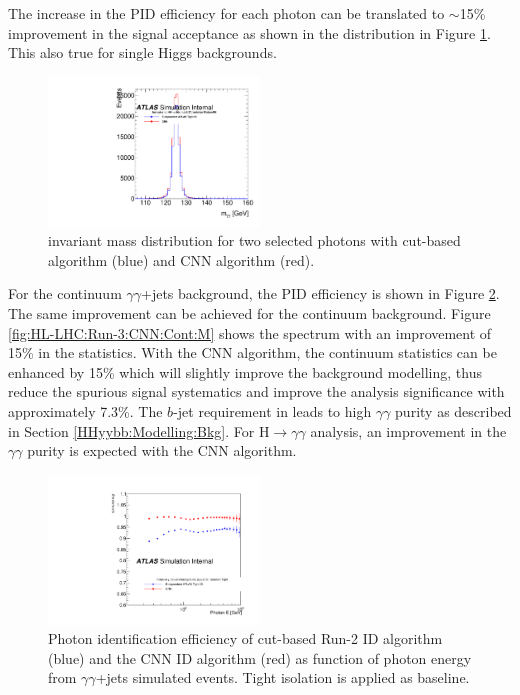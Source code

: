 The increase in the PID efficiency for each photon can be translated to $\sim$15\% improvement in the signal acceptance as shown in the \myy distribution in Figure \ref{fig:HL-LHC:Run-3:CNN:M}. This also true for single Higgs backgrounds.\\
 
\begin{figure}[htbp]
    \centering
    \includegraphics[width=0.5\textwidth]{Ch6/Img/Eff_MixtureNN_All_Inclusive_Tight_M.pdf}
     \begin{tcolorbox}[colback=black!5!white, colframe=white!75!black]
    \caption{\myy invariant mass distribution for two selected photons with cut-based algorithm (blue) and CNN algorithm (red).}
    \label{fig:HL-LHC:Run-3:CNN:M}
    \end{tcolorbox}
\end{figure}

For the continuum $\gamma\gamma$+jets background, the PID efficiency is shown in Figure \ref{fig:HL-LHC:Run-3:CNN:Cont:E}. The same improvement can be achieved for the continuum background. Figure \ref{fig:HL-LHC:Run-3:CNN:Cont:M} shows the \myy spectrum with an improvement of 15\% in the statistics. With the CNN algorithm, the continuum statistics can be enhanced by 15\% which will slightly improve the background modelling, thus reduce the spurious signal systematics and improve the analysis significance with approximately 7.3\%. The $b$-jet requirement in \HHyybb leads to high $\gamma\gamma$ purity as described in Section \ref{HHyybb:Modelling:Bkg}. For H$\to\gamma\gamma$ analysis, an improvement in the $\gamma\gamma$ purity is expected with the CNN algorithm.

\begin{figure}[htbp]
    \centering
    \includegraphics[width=0.5\textwidth]{Ch6/Img/Eff_Tight_All_Inclusive_Tight_E.pdf}
    \begin{tcolorbox}[colback=black!5!white, colframe=white!75!black]
    \caption{Photon identification efficiency of cut-based Run-2 ID algorithm (blue) and the CNN ID algorithm (red) as function of photon energy from $\gamma\gamma$+jets simulated events. Tight isolation is applied as baseline.}
    \label{fig:HL-LHC:Run-3:CNN:Cont:E}
    \end{tcolorbox}
\end{figure}

